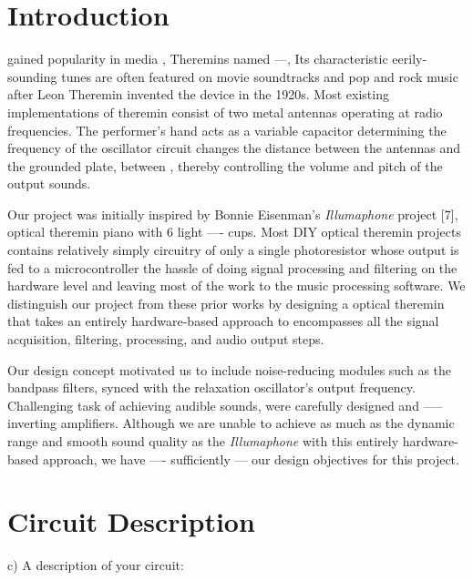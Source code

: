 \documentclass[twocolumn]{article}
\begin{document}
\section{Introduction}
 gained popularity in media ,
Theremins named ---, Its characteristic eerily-sounding tunes are often featured on movie soundtracks and pop and rock music after Leon Theremin invented the device in the 1920s. Most existing implementations of theremin consist of two metal antennas operating at radio frequencies. The performer's hand acts as a variable capacitor determining the frequency of the oscillator circuit changes the distance between the antennas and the grounded plate, between , thereby controlling the volume and pitch of the output sounds.
\par Our project was initially inspired by  Bonnie Eisenman's \textit{Illumaphone} project {\footnotesize[7]}, optical theremin piano with 6 light ---- cups.  Most DIY optical theremin projects contains relatively simply circuitry of only a single photoresistor whose output is fed to a microcontroller  the hassle of doing signal processing and filtering on the hardware level and leaving most of the work to the music processing software. We distinguish our project from these prior works by designing a optical theremin that takes an entirely hardware-based approach to encompasses all the signal acquisition, filtering, processing, and audio output steps. 
\par Our design concept motivated us to include noise-reducing modules such as the bandpass filters, synced with the relaxation oscillator's output frequency. Challenging task of achieving audible sounds, were  carefully designed and ----- inverting amplifiers. Although we are unable to achieve as much as the dynamic range and smooth sound quality as the \textit{Illumaphone} with this entirely hardware-based approach, we have ---- sufficiently --- our design objectives for this project.
\section{Circuit Description}
c)               A description of your circuit:
\end{document}
